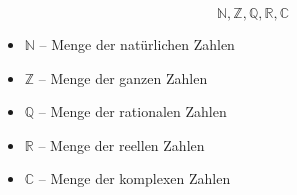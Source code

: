 \documentclass[a4paper,12pt]{article}
\begin{document}
\[
\mathbb{N}, \mathbb{Z}, \mathbb{Q}, \mathbb{R}, \mathbb{C}
\]

\begin{itemize}
    \item $\mathbb{N}$ – Menge der natürlichen Zahlen
    \item $\mathbb{Z}$ – Menge der ganzen Zahlen
    \item $\mathbb{Q}$ – Menge der rationalen Zahlen
    \item $\mathbb{R}$ – Menge der reellen Zahlen
    \item $\mathbb{C}$ – Menge der komplexen Zahlen
\end{itemize}
\end{document}
